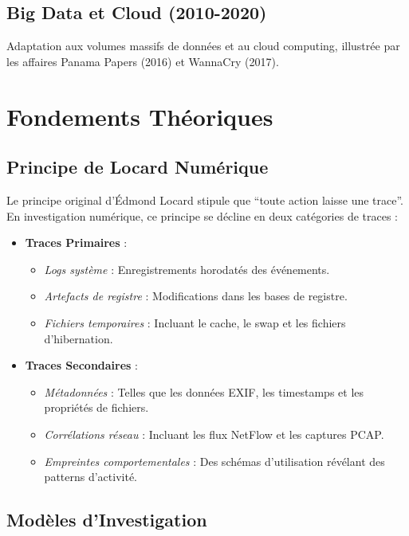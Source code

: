 \documentclass[12pt]{article}
\begin{document}
\subsection{Big Data et Cloud (2010-2020)}
Adaptation aux volumes massifs de données et au cloud computing, illustrée par les affaires Panama Papers (2016) et WannaCry (2017).

\section{Fondements Théoriques}
\subsection{Principe de Locard Numérique}

Le principe original d'Édmond Locard stipule que ``toute action laisse une trace''. En investigation numérique, ce principe se décline en deux catégories de traces :

\begin{itemize}[leftmargin=*]
    \item \textbf{Traces Primaires} :
    \begin{itemize}[leftmargin=*]
        \item \textit{Logs système} : Enregistrements horodatés des événements.
        \item \textit{Artefacts de registre} : Modifications dans les bases de registre.
        \item \textit{Fichiers temporaires} : Incluant le cache, le swap et les fichiers d'hibernation.
    \end{itemize}
    \item \textbf{Traces Secondaires} :
    \begin{itemize}[leftmargin=*]
        \item \textit{Métadonnées} : Telles que les données EXIF, les timestamps et les propriétés de fichiers.
        \item \textit{Corrélations réseau} : Incluant les flux NetFlow et les captures PCAP.
        \item \textit{Empreintes comportementales} : Des schémas d'utilisation révélant des patterns d'activité.
    \end{itemize}
\end{itemize}

\subsection{Modèles d’Investigation}
\end{document}
